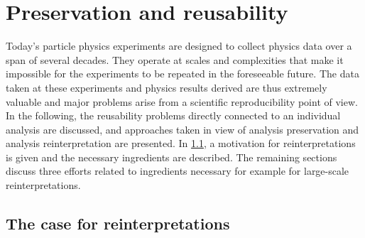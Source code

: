 
\chapter{Preservation and reusability}\label{ch:preservation}

\ifpdf
    \graphicspath{{chapter-preservation/Figs/Raster/}{chapter-preservation/Figs/PDF/}{chapter-preservation/Figs/}}
\else
    \graphicspath{{chapter-preservation/Figs/Vector/}{chapter-preservation/Figs/}}
\fi

Today's particle physics experiments are designed to collect physics data over a span of several decades. They operate at scales and complexities that make it impossible for the experiments to be repeated in the foreseeable future. The data taken at these experiments and physics results derived are thus extremely valuable and major problems arise from a scientific reproducibility point of view. In the following, the reusability problems directly connected to an individual analysis are discussed, and approaches taken in view of analysis preservation and analysis reinterpretation are presented. In \cref{sec:reinterpretations}, a motivation for reinterpretations is given and the necessary ingredients are described. The remaining sections discuss three efforts related to ingredients necessary for example for large-scale reinterpretations.

\section{The case for reinterpretations}\label{sec:reinterpretations}

